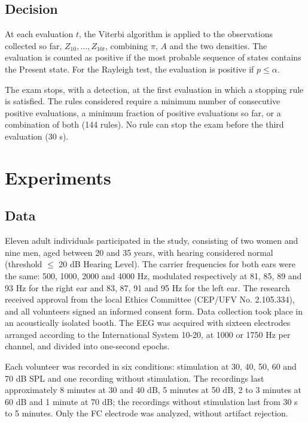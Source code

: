 \documentclass[conference]{IEEEtran}
\begin{document}
\subsection{Decision}

At each evaluation $t$, the Viterbi algorithm is applied to the observations collected so far, $Z_{10},\ldots,Z_{10t}$, combining $\pi$, $A$ and the two densities. The evaluation is counted as positive if the most probable sequence of states contains the Present state. For the Rayleigh test, the evaluation is positive if $p\le\alpha$.

The exam stops, with a detection, at the first evaluation in which a stopping rule is satisfied. The rules considered require a minimum number of consecutive positive evaluations, a minimum fraction of positive evaluations so far, or a combination of both (144 rules). No rule can stop the exam before the third evaluation (30 s).

\section{Experiments}

\subsection{Data}

Eleven adult individuals participated in the study, consisting of two women and nine men, aged between 20 and 35 years, with hearing considered normal (threshold $\le$ 20 dB Hearing Level). The carrier frequencies for both ears were the same: 500, 1000, 2000 and 4000 Hz, modulated respectively at 81, 85, 89 and 93 Hz for the right ear and 83, 87, 91 and 95 Hz for the left ear. The research received approval from the local Ethics Committee (CEP/UFV No. 2.105.334), and all volunteers signed an informed consent form. Data collection took place in an acoustically isolated booth. The EEG was acquired with sixteen electrodes arranged according to the International System 10-20, at 1000 or 1750 Hz per channel, and divided into one-second epochs.

Each volunteer was recorded in six conditions: stimulation at 30, 40, 50, 60 and 70 dB SPL and one recording without stimulation. The recordings last approximately 8 minutes at 30 and 40 dB, 5 minutes at 50 dB, 2 to 3 minutes at 60 dB and 1 minute at 70 dB; the recordings without stimulation last from 30 s to 5 minutes. Only the FC electrode was analyzed, without artifact rejection.
\end{document}
